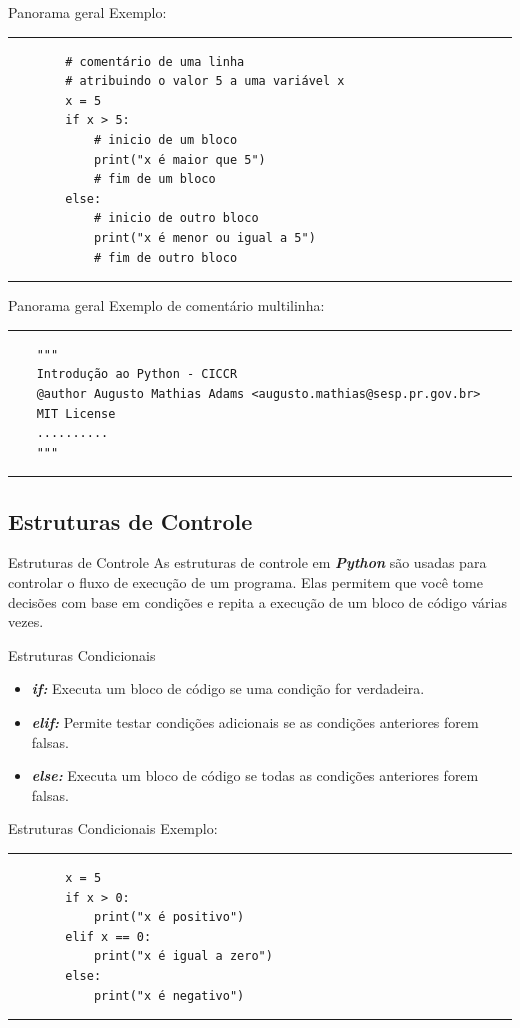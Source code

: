 \documentclass{beamer}
\begin{document}
\begin{frame}[fragile]{Panorama geral}
	Exemplo:
	\rule{\textwidth}{1pt}
	\scriptsize
	\begin{verbatim}
		# comentário de uma linha
		# atribuindo o valor 5 a uma variável x
		x = 5
		if x > 5: 
			# inicio de um bloco
			print("x é maior que 5")
			# fim de um bloco
		else:
			# inicio de outro bloco
			print("x é menor ou igual a 5")
			# fim de outro bloco
	\end{verbatim}
	\rule{\textwidth}{1pt}
\end{frame}

\begin{frame}[fragile]{Panorama geral}
	Exemplo de comentário multilinha:
	\rule{\textwidth}{1pt}
	\scriptsize
	\begin{verbatim}
	"""
	Introdução ao Python - CICCR
	@author Augusto Mathias Adams <augusto.mathias@sesp.pr.gov.br>
	MIT License
	..........
	"""
	\end{verbatim}

	\rule{\textwidth}{1pt}	
\end{frame}


\subsection{Estruturas de Controle}

\begin{frame}{Estruturas de Controle}
	As estruturas de controle em \textbf{\textit{Python}} são usadas para controlar o fluxo de execução de um programa. Elas permitem que você tome decisões com base em condições e repita a execução de um bloco de código várias vezes.
\end{frame}

\begin{frame}[fragile]{Estruturas Condicionais}
	\begin{itemize}
		\item  \textbf{\textit{if:}} Executa um bloco de código se uma condição for verdadeira.
		\item \textbf{\textit{elif:}} Permite testar condições adicionais se as condições anteriores forem falsas.
		\item \textbf{\textit{else:}} Executa um bloco de código se todas as condições anteriores forem falsas.
	\end{itemize}
\end{frame}

\begin{frame}[fragile]{Estruturas Condicionais}
	Exemplo:
	\rule{\textwidth}{1pt}
	\scriptsize
	\begin{verbatim}
		x = 5
		if x > 0:
			print("x é positivo")
		elif x == 0:
			print("x é igual a zero")
		else:
			print("x é negativo")
	\end{verbatim}
	\rule{\textwidth}{1pt}
\end{frame}
\end{document}
